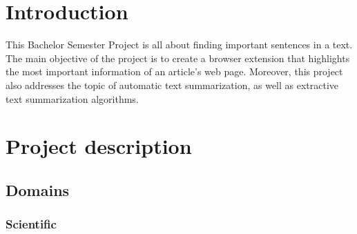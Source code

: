 \documentclass[conference,compsoc]{IEEEtran}
\begin{document}




\maketitle


\begin{abstract}

  \lipsum[1][]
\end{abstract}


%
\IEEEpeerreviewmaketitle


\section{Introduction}


This Bachelor Semester Project is all about finding important sentences in a text. The main objective of the project is to create a browser extension that highlights the most important information of an article's web page. Moreover, this project also addresses the topic of automatic text summarization, as well as extractive text summarization algorithms.


\section{Project description}
\subsection{Domains}
\subsubsection{Scientific}
\end{document}
